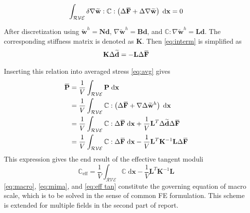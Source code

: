 \documentclass[10pt,a4paper]{scrreprt}
\newcommand{\myd}{\;\mathrm{d}}
\newcommand{\overbar}[1]{\mkern 1.5mu\overline{\mkern-1.5mu#1\mkern-1.5mu}\mkern 1.5mu}
\begin{document}
\begin{equation}
\label{eq:interm}
\int_{\mathcal{RVE}} \delta \nabla{\widetilde{\mathbf{w}}} : \mathbb{C} : \left( \Delta \overbar{\mathbf{F}} + \Delta \nabla{\widetilde{\mathbf{w}}} \right) \myd{\mathbf{x}} = 0
\end{equation}

After discretization using $\widetilde{\mathbf{w}}^{h} = \mathbf{N} \mathbf{d}$, $\nabla \widetilde{\mathbf{w}}^{h} = \mathbf{B} \mathbf{d}$, and $\mathbb{C} : \nabla \widetilde{\mathbf{w}}^{h} = \mathbf{L} \mathbf{d}$. The corresponding stiffness matrix is denoted as $\mathbf{K}$. Then \eqref{eq:interm} is simplified as 
\begin{equation}
\mathbf{K} \Delta \widetilde{\mathbf{d}} = - \mathbf{L} \Delta \overbar{\mathbf{F}}
\end{equation}

Inserting this relation into averaged stress \eqref{eq:avg} gives
\begin{equation}
\begin{split}
\overbar{\mathbf{P}} & = \dfrac{1}{V} \int_{\mathcal{RVE}} \mathbf{P} \myd{\mathbf{x}} \\ & = \dfrac{1}{V} \int_{\mathcal{RVE}} \mathbb{C} : \left( \Delta \overbar{\mathbf{F}} + \nabla{\Delta \widetilde{\mathbf{w}}^{h}} \right) \myd{\mathbf{x}} \\
& = \dfrac{1}{V} \int_{\mathcal{RVE}} \mathbb{C} : \Delta \overbar{\mathbf{F}} \myd{\mathbf{x}} + \dfrac{1}{V} \mathbf{L}^{T} \Delta \widetilde{\mathbf{d}} \Delta \overbar{\mathbf{F}}\\
& = \dfrac{1}{V} \int_{\mathcal{RVE}} \mathbb{C} : \Delta \overbar{\mathbf{F}} \myd{\mathbf{x}} - \dfrac{1}{V} \mathbf{L}^{T} \mathbf{K}^{-1} \mathbf{L} \Delta \overbar{\mathbf{F}} 
\end{split}
\end{equation}
This expression gives the end result of the effective tangent moduli
\begin{equation}
\label{eq:eff tan}
\mathbb{C}_{\text{eff}} = \dfrac{1}{V} \int_{\mathcal{RVE}} \mathbb{C} \myd{\mathbf{x}} - \dfrac{1}{V} \mathbf{L}^{T} \mathbf{K}^{-1} \mathbf{L} 
\end{equation}
\eqref{eq:macro}, \eqref{eq:mima}, and \eqref{eq:eff tan} constitute the governing equation of macro scale, which is to be solved in the sense of common FE formulation. This scheme is extended for multiple fields in the second part of report.
\end{document}
